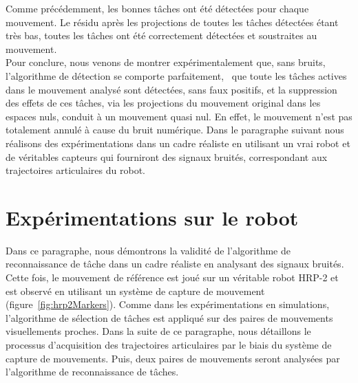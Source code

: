 Comme précédemment, les bonnes t\^aches ont été détectées pour chaque mouvement.
Le résidu après les projections de toutes les t\^aches détectées étant très bas, 
toutes les t\^aches ont été correctement détectées et soustraites au mouvement.\\

Pour conclure, nous venons de montrer expérimentalement que, sans bruits, l'algorithme de détection
se comporte parfaitement, \ie~que toute les t\^aches actives dans le mouvement analysé
sont détectées, sans faux positifs, et la suppression des effets de ces t\^aches, via les projections
du mouvement original dans les espaces nuls, conduit à un mouvement quasi nul. En effet, le mouvement
n'est pas totalement annulé à cause du bruit numérique. Dans le paragraphe suivant
nous réalisons des expérimentations dans un cadre réaliste en utilisant 
un vrai robot et de véritables capteurs qui fourniront des signaux bruités,
correspondant aux trajectoires articulaires du robot.

\section{Expérimentations sur le robot}
\label{sec:real}
Dans ce paragraphe, nous démontrons la validité de l'algorithme de
reconnaissance de t\^ache dans un cadre réaliste en analysant des signaux
bruités. Cette fois, le mouvement de référence est joué sur un véritable
robot HRP-2 et est observé en utilisant un système de capture de mouvement (figure~\ref{fig:hrp2Markers}).
Comme dans les expérimentations en simulations, l'algorithme de sélection de t\^aches est appliqué
sur des paires de mouvements visuellements proches.
Dans la suite de ce paragraphe, nous détaillons le processus d'acquisition 
des trajectoires articulaires par le biais du système de capture de mouvements.
Puis, deux paires de mouvements seront analysées par l'algorithme de reconnaissance
de t\^aches.

